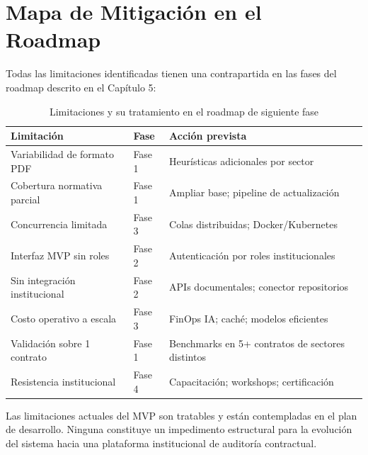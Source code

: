 \section*{Mapa de Mitigación en el Roadmap}

Todas las limitaciones identificadas tienen una contrapartida en las fases
del roadmap descrito en el Capítulo 5:

\begin{table}[H]
\centering
\caption{Limitaciones y su tratamiento en el roadmap de siguiente fase}
\label{tab:limitaciones_roadmap}
\begin{tabular}{p{5cm} p{2.5cm} p{5cm}}
\toprule
\textbf{Limitación} & \textbf{Fase} & \textbf{Acción prevista} \\
\midrule
Variabilidad de formato PDF     & Fase 1 & Heurísticas adicionales por sector \\
Cobertura normativa parcial     & Fase 1 & Ampliar base; pipeline de actualización \\
Concurrencia limitada           & Fase 3 & Colas distribuidas; Docker/Kubernetes \\
Interfaz MVP sin roles          & Fase 2 & Autenticación por roles institucionales \\
Sin integración institucional   & Fase 2 & APIs documentales; conector repositorios \\
Costo operativo a escala        & Fase 3 & FinOps IA; caché; modelos eficientes \\
Validación sobre 1 contrato     & Fase 1 & Benchmarks en 5+ contratos de sectores distintos \\
Resistencia institucional       & Fase 4 & Capacitación; workshops; certificación \\
\bottomrule
\end{tabular}
\end{table}

Las limitaciones actuales del MVP son tratables y están contempladas en el
plan de desarrollo. Ninguna constituye un impedimento estructural para la
evolución del sistema hacia una plataforma institucional de auditoría
contractual.